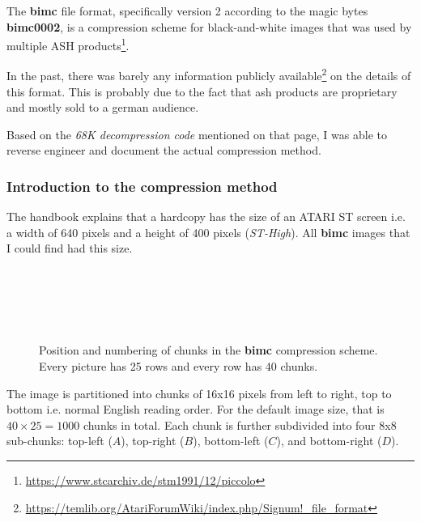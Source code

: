 The \textbf{bimc} file format, specifically version 2 according to the magic \glspl{byte} \textbf{bimc0002}, is a compression scheme for black-and-white images that was used by multiple \gls{ASH} products\footnote{\url{https://www.stcarchiv.de/stm1991/12/piccolo}}.

In the past, there was barely any information publicly available\footnote{\url{https://temlib.org/AtariForumWiki/index.php/Signum!_file_format}} on the details of this format. This is probably due to the fact that \acrshort{ash} products are proprietary and mostly sold to a german audience.

Based on the \textit{68K decompression code} mentioned on that page, I was able to reverse engineer and document the actual compression method.

\subsubsection{Introduction to the compression method}

The \Signum{} handbook \cite[p.~26]{schmerbeck1998signum} explains that a \gls{hardcopy} has the size of an ATARI ST screen i.e. a width of 640 pixels and a height of 400 pixels (\textit{ST-High}). All \textbf{bimc} images that I could find had this size.

\begin{figure}[h]
    \centering
       \chdots {}  \\
       \chdots {}  \\
    \cvdots \cvdots \cvdots \cmid \cvdots \cvdots \cvdots\\
       \chdots {}  \\
       \chdots {}  
    \caption{Position and numbering of chunks in the \textbf{bimc} compression scheme. Every picture has 25 rows and every row has 40 chunks.}
    \label{fig:bimc_chunk_layout}
\end{figure}

The image is partitioned into chunks of 16x16 pixels from left to right, top to bottom i.e. normal English reading order. For the default image size, that is $40 \times 25 = 1000$ chunks in total. Each chunk is further subdivided into four 8x8 sub-chunks: top-left ($A$), top-right ($B$), bottom-left ($C$), and bottom-right ($D$).

